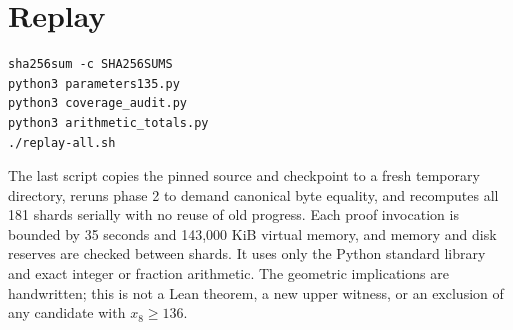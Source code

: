 \documentclass[11pt,letterpaper]{article}
\begin{document}
\section{Replay}\label{replay}

\begin{verbatim}
sha256sum -c SHA256SUMS
python3 parameters135.py
python3 coverage_audit.py
python3 arithmetic_totals.py
./replay-all.sh
\end{verbatim}

The last script copies the pinned source and checkpoint to a fresh
temporary directory, reruns phase 2 to demand canonical byte equality,
and recomputes all 181 shards serially with no reuse of old progress.
Each proof invocation is bounded by 35 seconds and 143,000 KiB virtual
memory, and memory and disk reserves are checked between shards. It uses
only the Python standard library and exact integer or fraction
arithmetic. The geometric implications are handwritten; this is not a
Lean theorem, a new upper witness, or an exclusion of any candidate with
\(x_8\ge136\).
\end{document}
